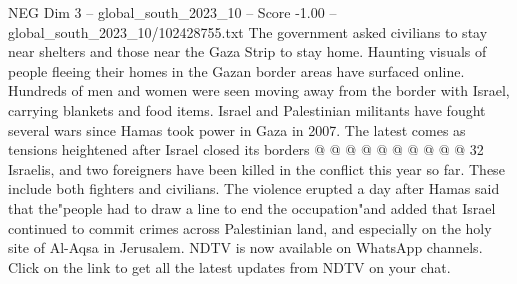 \begin{textsample}{NEG Dim 3 – global\_south\_2023\_10 – Score -1.00 – global\_south\_2023\_10/102428755.txt}
The government asked civilians to stay near shelters and those near the Gaza Strip to stay home.
Haunting visuals of people fleeing their homes in the Gazan border areas have surfaced online.
Hundreds of men and women were seen moving away from the border with Israel, carrying blankets and food items.
Israel and Palestinian militants have fought several wars since Hamas took power in Gaza in 2007.
The latest comes as tensions heightened after Israel closed its borders @ @ @ @ @ @ @ @ @ @ 32 Israelis, and two foreigners have been killed in the conflict this year so far.
These include both fighters and civilians.
The violence erupted a day after Hamas said that the"people had to draw a line to end the occupation"and added that Israel continued to commit crimes across Palestinian land, and especially on the holy site of Al-Aqsa in Jerusalem.
NDTV is now available on WhatsApp channels.
Click on the link to get all the latest updates from NDTV on your chat.

\end{textsample}
